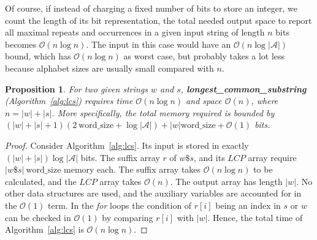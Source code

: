 \documentclass[submission]{dmtcs}
\newcommand{\Ode}{{\mathcal O}}
\newcommand\+[1]{\mathcal{#1}}
\newtheorem{proposition}[theorem]{Proposition}
\begin{document}
Of course, if instead of charging a fixed number of
bits to store an integer, we count the length of
its bit representation, the total needed output space
to report all maximal repeats and occurrences in a given input
string of length $n$ bits becomes $\Ode(n \log n)$.
The input in this case would have an $\Ode(n \log |\+A|)$ bound, which has
$\Ode(n \log n)$ as worst case, but probably takes a lot less because alphabet
sizes are usually small compared with $n$.

\begin{proposition}\label{prop:complexity1}
For two given strings $w$ and $s$, 
 {\bf longest\_common\_substring} (Algorithm~\ref{alg:lcs}) requires 
time $\Ode(n \log n)$ and space $\Ode(n)$, where $n = |w| + |s|$.
More specifically, the total memory required is bounded by
$(|w|+|s|+1)(2 \ \mbox{word\_size} + \log |\+A| ) + |w| \mbox{word\_size}
+ \Ode(1)$ bits.
\end{proposition}
\begin{proof}
Consider Algorithm~\ref{alg:lcs}.
Its input is stored in exactly $(|w|+|s|) \log |\+A|$ bits.
The suffix array $r$ of $w\$s$, and its $LCP$ array
require $|w\$s|\ \mbox{word\_size}$ memory each. The suffix array takes 
$\Ode(n \log n)$ to be calculated, and the $LCP$ array takes $\Ode(n)$.
The output array has length $|w|$.
No other data structures are used, and the
auxiliary variables are accounted for in the $\Ode(1)$ term.
In the {\em for} loops
the condition of $r[i]$ being an index in $s$ or $w$ 
can be checked in $\Ode(1)$ by comparing $r[i]$ with $|w|$. 
Hence, the total time of Algorithm~\ref{alg:lcs} is $\Ode(n \log n)$.
\end{proof}
\end{document}
